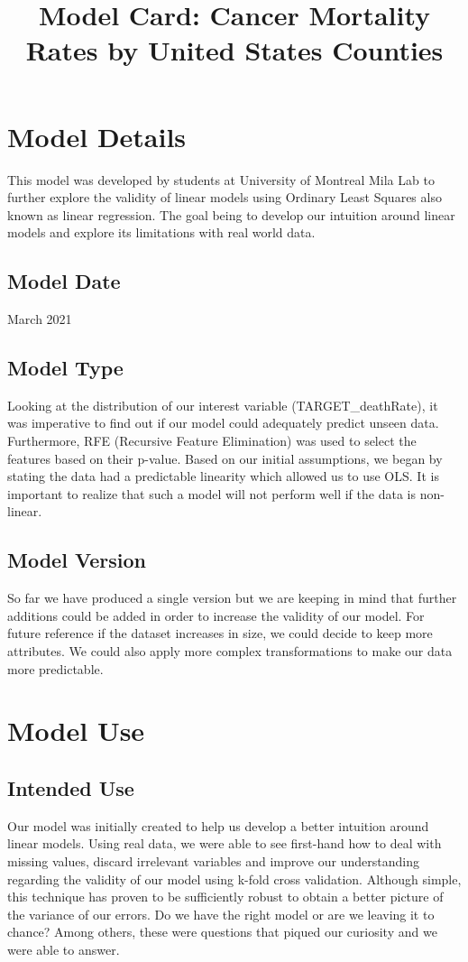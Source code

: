 \documentclass{article}
\title{\LARGE\bfseries Model Card: Cancer Mortality Rates by United States Counties}
\date{\vspace{-10ex}}
\begin{document}
\maketitle
\section*{Model Details}
This model was developed by students at University of Montreal Mila Lab to further explore the validity of linear models using Ordinary Least Squares also known as linear regression. The goal being to develop our intuition around linear models and explore its limitations with real world data. 
\subsection*{Model Date}
March 2021
\subsection*{Model Type}
Looking at the distribution of our interest variable (TARGET\_deathRate), it was imperative to find out if our model could adequately predict unseen data. Furthermore, RFE (Recursive Feature Elimination) was used to select the features based on their p-value. Based on our initial assumptions, we began by stating the data had a predictable linearity which allowed us to use OLS. It is important to realize that such a model will not perform well if the data is non-linear.
\subsection*{Model Version}
So far we have produced a single version but we are keeping in mind that further additions could be added in order to increase the validity of our model. For future reference if the dataset increases in size, we could decide to keep more attributes. We could also apply more complex transformations to make our data more predictable. 
\section*{Model Use}
\subsection*{Intended Use}
Our model was initially created to help us develop a better intuition around linear models. Using real data, we were able to see first-hand how to deal with missing values, discard irrelevant variables and improve our understanding regarding the validity of our model using k-fold cross validation. Although simple, this technique has proven to be sufficiently robust to obtain a better picture of the variance of our errors. Do we have the right model or are we leaving it to chance? Among others, these were questions that piqued our curiosity and we were able to answer. 
\end{document}
